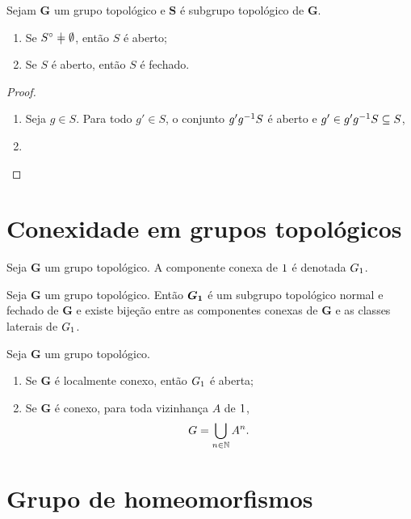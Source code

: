 \begin{proposition}
Sejam $\bm G$ um grupo topológico e $\bm S$ é subgrupo topológico de $\bm G$.
	\begin{enumerate}
	\item Se $\Int{S} \neq \emptyset$, então $S$ é aberto;
	\item Se $S$ é aberto, então $S$ é fechado.
	\end{enumerate}
\end{proposition}
\begin{proof}
	\begin{enumerate}
		\item Seja $g \in S$. Para todo $g' \in S$, o conjunto $g'g^{-1} S$ é aberto e $g'\in g'g^{-1} S \subseteq S$,
		\item
		\end{enumerate}
\end{proof}

\section{Conexidade em grupos topológicos}

\begin{definition}
Seja $\bm G$ um grupo topológico. A componente conexa de $1$ é denotada $G_1$.
\end{definition}

\begin{proposition}
Seja $\bm G$ um grupo topológico. Então $\bm{G_1}$ é um subgrupo topológico normal e fechado de $\bm G$ e existe bijeção entre as componentes conexas de $\bm G$ e as classes laterais de $G_1$.
\end{proposition}

\begin{proposition}
Seja $\bm G$ um grupo topológico.
	\begin{enumerate}
	\item Se $\bm G$ é localmente conexo, então $G_1$ é aberta;
	\item Se $\bm G$ é conexo, para toda vizinhança $A$ de $1$,
		\begin{equation*}
		G = \bigcup_{n \in \mathbb{N}} A^n.
		\end{equation*}
	\end{enumerate}
\end{proposition}

\section{Grupo de homeomorfismos}

